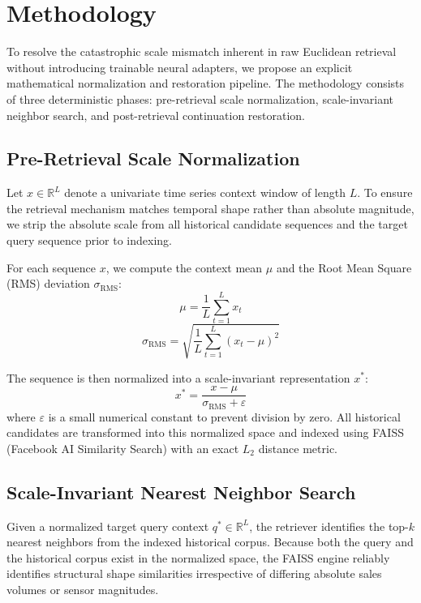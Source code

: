 \section{Methodology}
\label{sec:methodology}
\label{sec:method}

To resolve the catastrophic scale mismatch inherent in raw Euclidean retrieval without introducing trainable neural adapters, we propose an explicit mathematical normalization and restoration pipeline. The methodology consists of three deterministic phases: pre-retrieval scale normalization, scale-invariant neighbor search, and post-retrieval continuation restoration.

\subsection{Pre-Retrieval Scale Normalization}
Let $x \in \mathbb{R}^L$ denote a univariate time series context window of length $L$. To ensure the retrieval mechanism matches temporal shape rather than absolute magnitude, we strip the absolute scale from all historical candidate sequences and the target query sequence prior to indexing.

For each sequence $x$, we compute the context mean $\mu$ and the Root Mean Square (RMS) deviation $\sigma_{\text{RMS}}$:
\begin{equation}
\mu = \frac{1}{L}\sum_{t=1}^{L}x_t
\end{equation}
\begin{equation}
\sigma_{\text{RMS}} = \sqrt{\frac{1}{L}\sum_{t=1}^{L}(x_t-\mu)^2}
\end{equation}

The sequence is then normalized into a scale-invariant representation $x^*$:
\begin{equation}
x^* = \frac{x-\mu}{\sigma_{\text{RMS}} + \varepsilon}
\end{equation}
where $\varepsilon$ is a small numerical constant to prevent division by zero. All historical candidates are transformed into this normalized space and indexed using FAISS (Facebook AI Similarity Search) with an exact $L_2$ distance metric.

\subsection{Scale-Invariant Nearest Neighbor Search}
Given a normalized target query context $q^* \in \mathbb{R}^L$, the retriever identifies the top-$k$ nearest neighbors from the indexed historical corpus. Because both the query and the historical corpus exist in the normalized space, the FAISS engine reliably identifies structural shape similarities irrespective of differing absolute sales volumes or sensor magnitudes.

